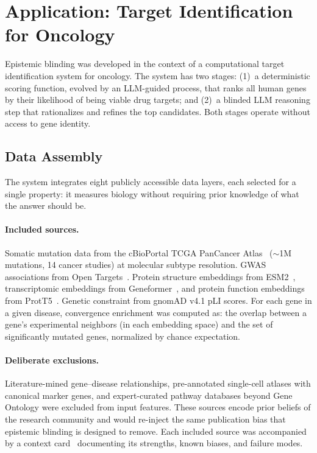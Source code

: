 \documentclass[sigconf, nonacm]{acmart}
\begin{document}
\section{Application: Target Identification for Oncology}

Epistemic blinding was developed in the context of a computational target identification system for oncology. The system has two stages: (1)~a deterministic scoring function, evolved by an LLM-guided process, that ranks all human genes by their likelihood of being viable drug targets; and (2)~a blinded LLM reasoning step that rationalizes and refines the top candidates. Both stages operate without access to gene identity.

\subsection{Data Assembly}

The system integrates eight publicly accessible data layers, each selected for a single property: it measures biology without requiring prior knowledge of what the answer should be.

\paragraph{Included sources.} Somatic mutation data from the cBioPortal TCGA PanCancer Atlas~\cite{hoadley2018} ($\sim$1M mutations, 14 cancer studies) at molecular subtype resolution. GWAS associations from Open Targets~\cite{ochoa2023}. Protein structure embeddings from ESM2~\cite{lin2023}, transcriptomic embeddings from Geneformer~\cite{theodoris2023}, and protein function embeddings from ProtT5~\cite{elnaggar2022}. Genetic constraint from gnomAD v4.1 pLI scores. For each gene in a given disease, convergence enrichment was computed as: the overlap between a gene's experimental neighbors (in each embedding space) and the set of significantly mutated genes, normalized by chance expectation.

\paragraph{Deliberate exclusions.} Literature-mined gene--disease relationships, pre-annotated single-cell atlases with canonical marker genes, and expert-curated pathway databases beyond Gene Ontology were excluded from input features. These sources encode prior beliefs of the research community and would re-inject the same publication bias that epistemic blinding is designed to remove. Each included source was accompanied by a context card~\cite{gebru2021} documenting its strengths, known biases, and failure modes.
\end{document}
